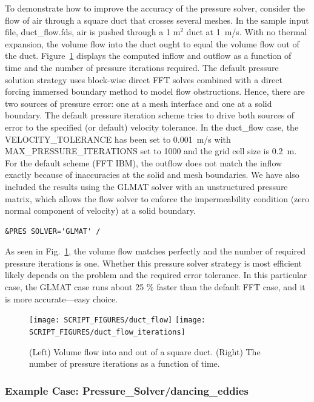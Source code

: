 \documentclass[11pt]{book}
\begin{document}
To demonstrate how to improve the accuracy of the pressure solver, consider the flow of air through a square duct that crosses several meshes. In the sample input file, {\ct duct\_flow.fds}, air is pushed through a 1 m$^2$ duct at 1~m/s. With no thermal expansion, the volume flow into the duct ought to equal the volume flow out of the duct. Figure~\ref{duct_flow_fig} displays the computed inflow and outflow as a function of time and the number of pressure iterations required. The default pressure solution strategy uses block-wise direct FFT solves combined with a direct forcing immersed boundary method to model flow obstructions.  Hence, there are two sources of pressure error: one at a mesh interface and one at a solid boundary.  The default pressure iteration scheme tries to drive both sources of error to the specified (or default) velocity tolerance. In the {\ct duct\_flow} case, the {\ct VELOCITY\_TOLERANCE} has been set to 0.001~m/s with {\ct MAX\_PRESSURE\_ITERATIONS} set to 1000 and the grid cell size is 0.2~m.  For the default scheme (FFT IBM), the outflow does not match the inflow exactly because of inaccuracies at the solid and mesh boundaries.  We have also included the results using the GLMAT solver with an unstructured pressure matrix, which allows the flow solver to enforce the impermeability condition (zero normal component of velocity) at a solid boundary.
\begin{lstlisting}
&PRES SOLVER='GLMAT' /
\end{lstlisting}
As seen in Fig.~\ref{duct_flow_fig}, the volume flow matches perfectly and the number of required pressure iterations is one.  Whether this pressure solver strategy is most efficient likely depends on the problem and the required error tolerance.  In this particular case, the GLMAT case runs about 25 \% faster than the default FFT case, and it is more accurate---easy choice.

\begin{figure}[ht]
\begin{center}
\texttt{[image: SCRIPT\_FIGURES/duct\_flow]}
\texttt{[image: SCRIPT\_FIGURES/duct\_flow\_iterations]}
\end{center}
\caption[Results of the {\ct duct\_flow} test case]{(Left) Volume flow into and out of a square duct. (Right) The number of pressure iterations as a function of time.}
\label{duct_flow_fig}
\end{figure}


\subsubsection{Example Case: Pressure\_Solver/dancing\_eddies}
\end{document}
